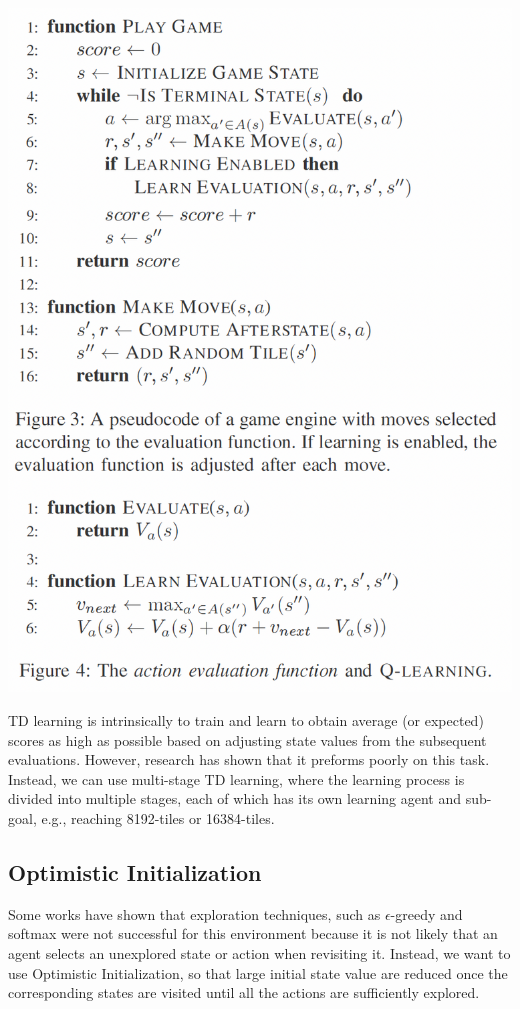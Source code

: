 \documentclass[letterpaper]{article} %
\begin{document}
\begin{center}
    \includegraphics[scale=.5]{images/main-algo.png}
\end{center}

TD learning is intrinsically to train and learn to obtain average (or expected) scores as high as possible based on adjusting state values from the subsequent evaluations. However, research has shown that it preforms poorly on this task. Instead, we can use multi-stage TD learning, where the learning process is divided  into multiple stages, each of which has its own learning agent and sub-goal, e.g., reaching 8192-tiles or 16384-tiles.

\subsection{Optimistic Initialization}

Some works have shown that exploration techniques, such as $\epsilon$-greedy and softmax were not successful for this environment because it is not likely that an agent selects an unexplored state or action when revisiting it. Instead, we want to use Optimistic Initialization, so that large initial state value are reduced once the corresponding states are visited until all the actions are sufficiently explored.
\end{document}
